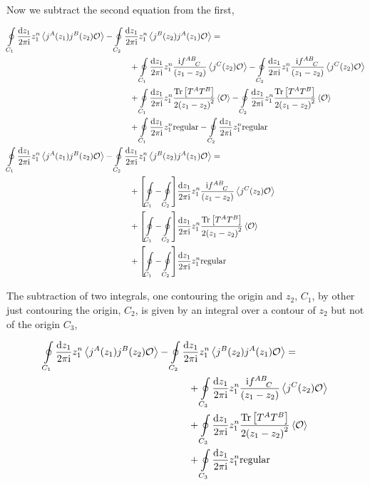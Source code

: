 Now we subtract the second equation from the first,

\begin{align*}
    \oint\limits_{C_1}\frac{\dd{{z_1}}}{2\pi\im}z_1^n\expval{j^A\qty(z_1)j ^B\qty(z_2)\mathcal O}&-\oint\limits_{C_2}\frac{\dd{{z_1}}}{2\pi\im}z_1^n\expval{j ^B\qty(z_2)j^A\qty(z_1)\mathcal O}=\\
    &\quad\quad\quad+\oint\limits_{C_1}\frac{\dd{{z_1}}}{2\pi\im}z_1^n\frac{\im\tensor{f}{^A^B_C}}{\qty(z_1-z_2)}\expval{j^C\qty(z_2)\mathcal O}-\oint\limits_{C_2}\frac{\dd{{z_1}}}{2\pi\im}z_1^n\frac{\im\tensor{f}{^A^B_C}}{\qty(z_1-z_2)}\expval{j^C\qty(z_2)\mathcal O}\\
    &\quad\quad\quad+\oint\limits_{C_1}\frac{\dd{{z_1}}}{2\pi\im}z_1^n\frac{\Tr\qty[T^A T^B]}{2\qty(z_1-z_2)^2}\expval{\mathcal O}-\oint\limits_{C_2}\frac{\dd{{z_1}}}{2\pi\im}z_1^n\frac{\Tr\qty[T^A T^B]}{2\qty(z_1-z_2)^2}\expval{\mathcal O}\\
    &\quad\quad\quad+\oint\limits_{C_1}\frac{\dd{{z_1}}}{2\pi\im}z_1^n\textnormal{regular}-\oint\limits_{C_2}\frac{\dd{{z_1}}}{2\pi\im}z_1^n\textnormal{regular}\\
    \oint\limits_{C_1}\frac{\dd{{z_1}}}{2\pi\im}z_1^n\expval{j^A\qty(z_1)j ^B\qty(z_2)\mathcal O}&-\oint\limits_{C_2}\frac{\dd{{z_1}}}{2\pi\im}z_1^n\expval{j ^B\qty(z_2)j^A\qty(z_1)\mathcal O}=\\
    &\quad\quad\quad+\qty[\oint\limits_{C_1}-\oint\limits_{C_2}]\frac{\dd{{z_1}}}{2\pi\im}z_1^n\frac{\im\tensor{f}{^A^B_C}}{\qty(z_1-z_2)}\expval{j^C\qty(z_2)\mathcal O}\\
    &\quad\quad\quad+\qty[\oint\limits_{C_1}-\oint\limits_{C_2}]\frac{\dd{{z_1}}}{2\pi\im}z_1^n\frac{\Tr\qty[T^A T^B]}{2\qty(z_1-z_2)^2}\expval{\mathcal O}\\
    &\quad\quad\quad+\qty[\oint\limits_{C_1}-\oint\limits_{C_2}]\frac{\dd{{z_1}}}{2\pi\im}z_1^n\textnormal{regular}
\end{align*}

The subtraction of two integrals, one contouring the origin and $z_2$, $C_1$, by other just contouring the origin, $C_2$, is given by an integral 
over a contour of $z_2$ but not of the origin $C_3$,

\begin{align*}
    \oint\limits_{C_1}\frac{\dd{{z_1}}}{2\pi\im}z_1^n\expval{j^A\qty(z_1)j ^B\qty(z_2)\mathcal O}&-\oint\limits_{C_2}\frac{\dd{{z_1}}}{2\pi\im}z_1^n\expval{j ^B\qty(z_2)j^A\qty(z_1)\mathcal O}=\\
    &\quad\quad\quad+\oint\limits_{C_3}\frac{\dd{{z_1}}}{2\pi\im}z_1^n\frac{\im\tensor{f}{^A^B_C}}{\qty(z_1-z_2)}\expval{j^C\qty(z_2)\mathcal O}\\
    &\quad\quad\quad+\oint\limits_{C_3}\frac{\dd{{z_1}}}{2\pi\im}z_1^n\frac{\Tr\qty[T^A T^B]}{2\qty(z_1-z_2)^2}\expval{\mathcal O}\\
    &\quad\quad\quad+\oint\limits_{C_3}\frac{\dd{{z_1}}}{2\pi\im}z_1^n\textnormal{regular}
\end{align*}

